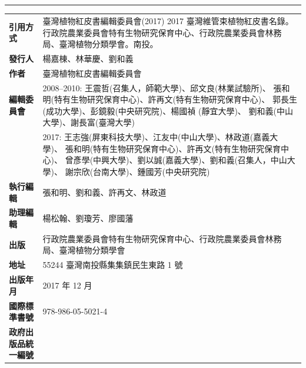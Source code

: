 \clearpage
\pagestyle{plain}
\thispagestyle{empty}
\linespread{1.5}
\noindent\huge \color{red}{2017 臺灣維管束植物紅皮書名錄} \\
\noindent\Large \color{red}{The Red List of Vascular Plants of Taiwan, 2017} \\
\normalsize
\hrule
\begin{table}[H]
  \tiny
  \Kai
  {\renewcommand\arraystretch{1.5}
  \begin{tabular}{>{\raggedright\arraybackslash}p{3cm}p{8cm}}
      \textbf{引用方式}          & 臺灣植物紅皮書編輯委員會(2017) 
                                        2017 臺灣維管束植物紅皮書名錄。
                                        行政院農業委員會特有生物研究保育中心、行政院農業委員會林務局、臺灣植物分類學會。南投。\\
      \textbf{發行人}                 & 楊嘉棟、林華慶、劉和義 \\
      \textbf{作者}                   & 臺灣植物紅皮書編輯委員會 \\
      \textbf{編輯委員會}             & 2008--2010: 王震哲(召集人，師範大學)、邱文良(林業試驗所)、
                                        張和明(特有生物研究保育中心)、許再文(特有生物研究保育中心)、
                                        郭長生(成功大學)、彭鏡毅(中央研究院)、楊國禎 (靜宜大學)、
                                        劉和義(中山大學)、謝長富(臺灣大學) \\
                                      & 2017: 王志強(屏東科技大學)、江友中(中山大學)、林政道(嘉義大學)、
                                        張和明(特有生物研究保育中心)、許再文(特有生物研究保育中心)、
                                        曾彥學(中興大學)、劉以誠(嘉義大學)、劉和義(召集人，中山大學)、
                                        謝宗欣(台南大學)、鍾國芳(中央研究院) \\
      \textbf{執行編輯}          & 張和明、劉和義、許再文、林政道 \\
      \textbf{助理編輯}          & 楊松翰、劉瓊芳、廖國藩 \\
      \textbf{出版}              & 行政院農業委員會特有生物研究保育中心、行政院農業委員會林務局、臺灣植物分類學會 \\
      \textbf{地址}              & 55244 臺灣南投縣集集鎮民生東路 1 號 \\
      \textbf{出版年月}          & 2017 年 12 月 \\
      \textbf{國際標準書號}              & 978-986-05-5021-4 \\
      \textbf{政府出版品統一編號}               & \\

\end{tabular}}
\end{table}
